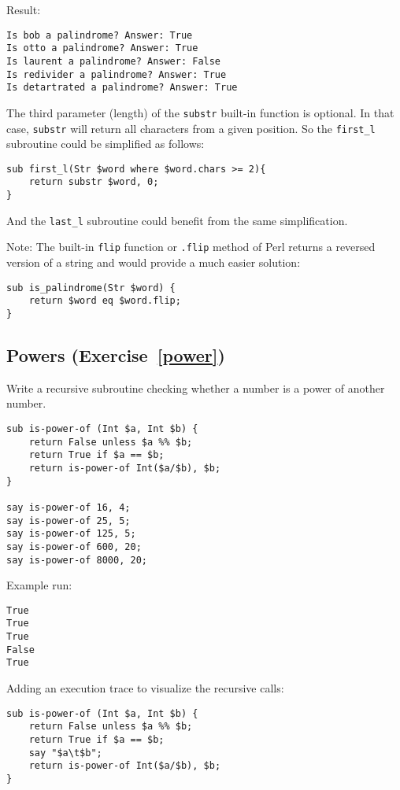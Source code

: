 Result:
\begin{verbatim}
Is bob a palindrome? Answer: True
Is otto a palindrome? Answer: True
Is laurent a palindrome? Answer: False
Is redivider a palindrome? Answer: True
Is detartrated a palindrome? Answer: True
\end{verbatim}

The third parameter (length) of the {\tt substr} built-in 
function is optional. In that case, {\tt substr} will return 
all characters from a given position. So the \verb'first_l'  
subroutine could be simplified as follows:

\begin{verbatim}
sub first_l(Str $word where $word.chars >= 2){
    return substr $word, 0;
}
\end{verbatim} 

And the \verb'last_l' subroutine could benefit from the same 
simplification.

Note: The built-in {\tt flip} function or {\tt .flip} method 
of Perl returns a reversed version of a string and would 
provide a much easier solution:

\begin{verbatim}
sub is_palindrome(Str $word) {
    return $word eq $word.flip;
}
\end{verbatim}

\subsection{Powers (Exercise~\ref{power})}
\label{sol_power}

Write a recursive subroutine checking whether a number is 
a power of another number.

\begin{verbatim}
sub is-power-of (Int $a, Int $b) {
    return False unless $a %% $b;
    return True if $a == $b;
    return is-power-of Int($a/$b), $b;
}

say is-power-of 16, 4;
say is-power-of 25, 5;
say is-power-of 125, 5;
say is-power-of 600, 20;
say is-power-of 8000, 20;
\end{verbatim}
%

Example run:
\begin{verbatim}
True
True
True
False
True
\end{verbatim}

Adding an execution trace to visualize the recursive calls:

\begin{verbatim}
sub is-power-of (Int $a, Int $b) {     
    return False unless $a %% $b;      
    return True if $a == $b;           
    say "$a\t$b";                      
    return is-power-of Int($a/$b), $b; 
}                                      
\end{verbatim}


